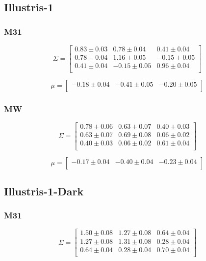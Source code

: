 \documentclass[a4paper,fleqn,usenatbib]{mnras}
\begin{document}
\subsection{Illustris-1}

\subsubsection{M31}

\[
\Sigma= 
\begin{bmatrix}
0.83\pm 0.03  & 0.78\pm 0.04  & 0.41\pm 0.04\\
0.78\pm 0.04  & 1.16\pm 0.05 & -0.15\pm 0.05\\
0.41\pm 0.04 & -0.15\pm 0.05 & 0.96\pm 0.04\\
\end{bmatrix}
\]

\[
\mu= 
\begin{bmatrix}
-0.18\pm 0.04 & -0.41\pm 0.05 & -0.20\pm 0.05\\
\end{bmatrix}
\]

\subsubsection{MW}

\[
\Sigma= 
\begin{bmatrix}
 0.78\pm 0.06 & 0.63 \pm 0.07  & 0.40 \pm 0.03\\
  0.63\pm 0.07 & 0.69 \pm 0.08 &  0.06 \pm 0.02\\
  0.40\pm 0.03 & 0.06 \pm 0.02 &  0.61\pm 0.04\\
\end{bmatrix}
\]

\[
\mu= 
\begin{bmatrix}
-0.17\pm 0.04 & -0.40\pm 0.04 & -0.23\pm 0.04\\
\end{bmatrix}
\]

\subsection{Illustris-1-Dark}

\subsubsection{M31}

\[
\Sigma= 
\begin{bmatrix}
 1.50\pm 0.08 & 1.27\pm 0.08 & 0.64\pm 0.04\\
  1.27\pm 0.08 &  1.31\pm 0.08&  0.28\pm 0.04\\
  0.64\pm 0.04 &  0.28\pm 0.04 & 0.70\pm 0.04\\
\end{bmatrix}
\]
\end{document}
